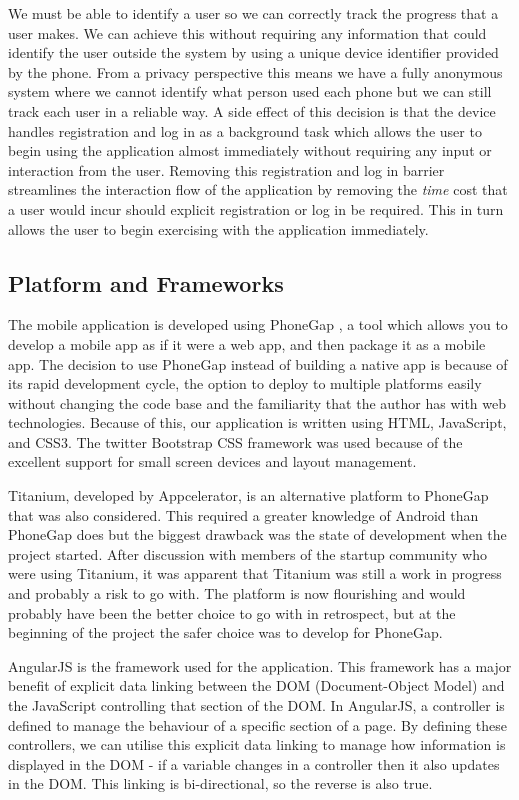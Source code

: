 We must be able to identify a user so we can correctly track the
progress that a user makes. We can achieve this without requiring any
information that could identify the user outside the system by using a
unique device identifier provided by the phone. From a privacy 
perspective this means we have a fully anonymous system where we
cannot identify what person used each phone but we can still track
each user in a reliable way. A side effect of this decision is that
the device handles registration and log in as a background task which
allows the user to begin using the application almost immediately
without requiring any input or interaction from the user. Removing
this registration and log in barrier streamlines the interaction flow
of the application by removing the \emph{time} cost that a user would
incur should explicit registration or log in be required. This in turn
allows the user to begin exercising with the application immediately.

\subsection{Platform and Frameworks}
The mobile application is developed using PhoneGap \cite{phonegap}, 
a tool which allows you to develop a mobile app as if it were
a web app, and then package it as a mobile app. The decision to use
PhoneGap instead of building a native app is because of its rapid
development cycle, the option to deploy to multiple platforms easily
without changing the code base and the familiarity that the author has
with web technologies. Because of this, our application is written
using HTML, JavaScript, and CSS3. The twitter Bootstrap CSS framework
\cite{bootstrap} was used because of the excellent support for small
screen devices and layout management. 

Titanium, developed by Appcelerator\cite{titanium}, is an alternative
platform to PhoneGap that was also considered. This required a greater
knowledge of Android than PhoneGap does but the biggest drawback was
the state of development when the project started. After discussion
with members of the startup community who were using Titanium, it was
apparent that Titanium was still a work in progress and probably a
risk to go with. The platform is now flourishing and would probably
have been the better choice to go with in retrospect, but at the
beginning of the project the safer choice was to develop for PhoneGap.

AngularJS\cite{angularjs} is the framework used for the
application. This framework has a major benefit of explicit data linking
between the DOM (Document-Object Model) and the JavaScript controlling
that section of the DOM. In AngularJS, a controller is defined to
manage the behaviour of a specific section of a page. By defining
these controllers, we can utilise this explicit data linking to manage
how information is displayed in the DOM - if a variable changes in a
controller then it also updates in the DOM. This linking is
bi-directional, so the reverse is also true. 

